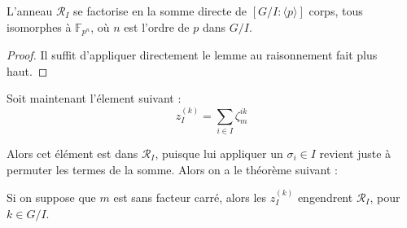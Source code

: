 \documentclass[a4paper]{article} %
\numberwithin{equation}{section}
\newcommand\GF[1]{\mathbb{F}_{#1}}
\begin{document}
\begin{cor}
\label{coreng}
L'anneau $\mathcal{R}_I$ se factorise en la somme directe de $[G/I:\langle p \rangle]$ corps, tous isomorphes à $\GF{p^n}$, où $n$ est l'ordre de $p$ dans $G/I$.
\end{cor}
\begin{proof}
Il suffit d'appliquer directement le lemme au raisonnement fait plus haut. %
\end{proof}

Soit maintenant l'élement suivant :
\begin{equation}
z_I^{(k)} = \sum_{i\in{I}}{\zeta_m^{ik}}
\end{equation}

Alors cet élément est dans $\mathcal{R}_I$, puisque lui appliquer un $\sigma_i\in{I}$ revient juste à permuter les termes de la somme. Alors on a le théorème suivant :
 
\begin{thm}
Si on suppose que $m$ est sans facteur carré, alors les $z_I^{(k)}$ engendrent $\mathcal{R}_I$, pour $k\in G/I$.
\end{thm}
\end{document}
